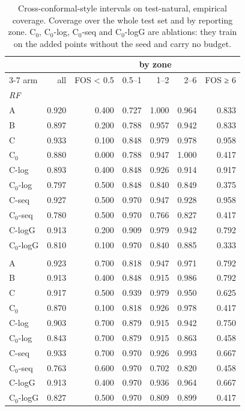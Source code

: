 \begin{table}[htbp]
\centering
\caption{Cross-conformal-style intervals on test-natural, empirical coverage. Coverage over the whole test set and by reporting zone. C$_0$, C$_0$-log, C$_0$-seq and C$_0$-logG are ablations: they train on the added points without the seed and carry no budget.}
\label{tab:test-natural__fos-rmse:conformal}
\begin{tabular}{lrrrrrr}
\toprule
 &  & \multicolumn{5}{c}{by zone} \\
\cmidrule(lr){3-7}
arm & all & FOS < 0.5 & 0.5–1 & 1–2 & 2–6 & FOS ≥ 6 \\
\midrule
\multicolumn{7}{l}{\textit{RF}} \\
A & 0.920 & 0.400 & 0.727 & 1.000 & 0.964 & 0.833 \\
B & 0.897 & 0.200 & 0.788 & 0.957 & 0.942 & 0.833 \\
C & 0.933 & 0.100 & 0.848 & 0.979 & 0.978 & 0.958 \\
C$_0$ & 0.880 & 0.000 & 0.788 & 0.947 & 1.000 & 0.417 \\
C-log & 0.893 & 0.400 & 0.848 & 0.926 & 0.914 & 0.917 \\
C$_0$-log & 0.797 & 0.500 & 0.848 & 0.840 & 0.849 & 0.375 \\
C-seq & 0.927 & 0.500 & 0.970 & 0.947 & 0.928 & 0.958 \\
C$_0$-seq & 0.780 & 0.500 & 0.970 & 0.766 & 0.827 & 0.417 \\
C-logG & 0.913 & 0.200 & 0.909 & 0.979 & 0.942 & 0.792 \\
C$_0$-logG & 0.810 & 0.100 & 0.970 & 0.840 & 0.885 & 0.333 \\
\addlinespace
\multicolumn{7}{l}{\textit{GBM}} \\
A & 0.923 & 0.700 & 0.818 & 0.947 & 0.971 & 0.792 \\
B & 0.913 & 0.400 & 0.848 & 0.915 & 0.986 & 0.792 \\
C & 0.917 & 0.500 & 0.939 & 0.979 & 0.950 & 0.625 \\
C$_0$ & 0.870 & 0.100 & 0.818 & 0.926 & 0.978 & 0.417 \\
C-log & 0.903 & 0.700 & 0.879 & 0.915 & 0.942 & 0.750 \\
C$_0$-log & 0.843 & 0.700 & 0.879 & 0.915 & 0.863 & 0.458 \\
C-seq & 0.933 & 0.700 & 0.970 & 0.926 & 0.993 & 0.667 \\
C$_0$-seq & 0.763 & 0.600 & 0.970 & 0.702 & 0.820 & 0.458 \\
C-logG & 0.913 & 0.400 & 0.970 & 0.936 & 0.964 & 0.667 \\
C$_0$-logG & 0.827 & 0.500 & 0.970 & 0.809 & 0.899 & 0.417 \\
\bottomrule
\end{tabular}
\end{table}
